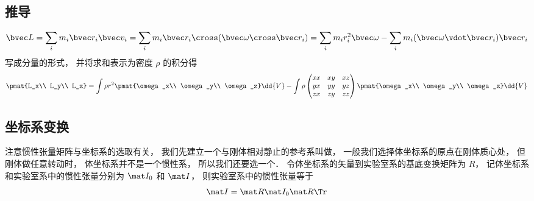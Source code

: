 \subsection{推导}
\begin{equation}
\bvec L = \sum_i m_i \bvec r_i \bvec v_i = \sum_i m_i \bvec r_i \cross (\bvec \omega \cross \bvec r_i) = \sum_i m_i r_i^2 \bvec \omega - \sum_i m_i (\bvec \omega \vdot \bvec r_i) \bvec r_i
\end{equation}
写成分量的形式， 并将求和表示为密度 $\rho$ 的积分得
\begin{equation}
\pmat{L_x\\ L_y\\ L_z} = \int \rho r^2 \pmat{\omega_x\\ \omega_y\\ \omega_z} \dd{V} - \int \rho
\begin{pmatrix}
xx & xy & xz\\
yx & yy & yz\\
zx & zy & zz
\end{pmatrix}
\pmat{\omega_x\\ \omega_y\\ \omega_z} \dd{V}
\end{equation}

\subsection{坐标系变换}
注意惯性张量矩阵与坐标系的选取有关， 我们先建立一个与刚体相对静止的参考系叫做， 一般我们选择体坐标系的原点在刚体质心处， 但刚体做任意转动时， 体坐标系并不是一个惯性系， 所以我们还要选一个． 令体坐标系的矢量到实验室系的基底变换矩阵为 $R$， 记体坐标系和实验室系中的惯性张量分别为 $\mat I_0$ 和 $\mat I$， 则实验室系中的惯性张量等于
\begin{equation}
\mat I = \mat R \mat I_0 \mat R\Tr
\end{equation}

